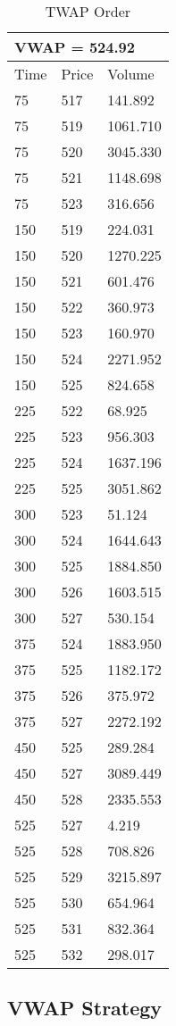 \begin{table}[htbp]
\begin{center}
\caption{TWAP Order} \label{tab:twap_order}
\begin{tabular}{l|l|l}
\hline \hline
\multicolumn{3}{l}{VWAP = 524.92} \\
\hline
Time     & Price    & Volume      \\
\hline
75       & 517      & 141.892     \\
75       & 519      & 1061.710    \\
75       & 520      & 3045.330    \\
75       & 521      & 1148.698    \\
75       & 523      & 316.656     \\
150      & 519      & 224.031     \\
150      & 520      & 1270.225    \\
150      & 521      & 601.476     \\
150      & 522      & 360.973     \\
150      & 523      & 160.970     \\
150      & 524      & 2271.952    \\
150      & 525      & 824.658     \\
225      & 522      & 68.925      \\
225      & 523      & 956.303     \\
225      & 524      & 1637.196    \\
225      & 525      & 3051.862    \\
300      & 523      & 51.124      \\
300      & 524      & 1644.643    \\
300      & 525      & 1884.850    \\
300      & 526      & 1603.515    \\
300      & 527      & 530.154     \\
375      & 524      & 1883.950    \\
375      & 525      & 1182.172    \\
375      & 526      & 375.972     \\
375      & 527      & 2272.192    \\
450      & 525      & 289.284     \\
450      & 527      & 3089.449    \\
450      & 528      & 2335.553    \\
525      & 527      & 4.219       \\
525      & 528      & 708.826     \\
525      & 529      & 3215.897    \\
525      & 530      & 654.964     \\
525      & 531      & 832.364     \\
525      & 532      & 298.017    
\end{tabular}
\end{center}
\end{table}



\subsection{VWAP Strategy}


